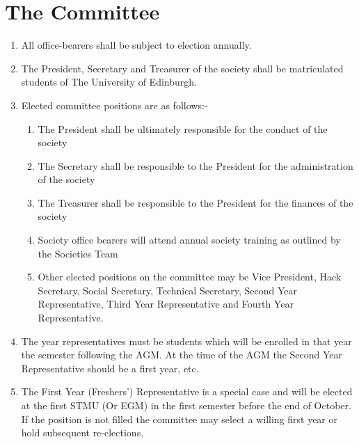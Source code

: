 \documentclass{article}
\begin{document}
\newpage{}
\section{The Committee}

\begin {enumerate}
  
  \item All office-bearers shall be subject to election annually.

  \item The President, Secretary and Treasurer of the society shall be matriculated students of The University of Edinburgh.

  \item Elected committee positions are as follows:-
    \begin{enumerate}
      \item The President shall be ultimately responsible for the conduct of the society
      \item The Secretary shall be responsible to the President for the administration of the society
      \item The Treasurer shall be responsible to the President for the finances of the society
      \item Society office bearers will attend annual society training as outlined by the Societies Team
      \item Other elected positions on the committee may be Vice President, Hack Secretary, Social
        Secretary, Technical Secretary, Second Year Representative, 
        Third Year Representative and Fourth Year Representative.
    \end{enumerate}

  \item The year representatives must be students which will be enrolled in that year the semester 
    following the AGM. At the time of the AGM the Second Year Representative should be a first year, etc.
  
  \item The First Year (Freshers') Representative is a special case and will be elected at the first STMU (Or EGM)
    in the first semester before the end of October. If the position is not filled the committee may select a
    willing first year or hold subsequent re-elections.


\end{enumerate}
\end{document}
